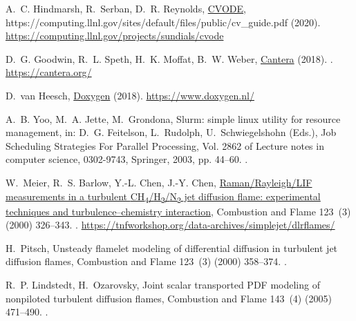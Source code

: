 \documentclass[preprint,12pt, a4paper]{elsarticle}
\begin{document}
\begin{thebibliography}{10}
A.~C. Hindmarsh, R.~Serban, D.~R. Reynolds,
  \href{https://computing.llnl.gov/projects/sundials/cvode}{{CVODE}},
  https://computing.llnl.gov/sites/default/files/public/cv{\_}guide.pdf (2020).
\newline\urlprefix\url{https://computing.llnl.gov/projects/sundials/cvode}

D.~G. Goodwin, R.~L. Speth, H.~K. Moffat, B.~W. Weber,
  \href{https://cantera.org/}{Cantera} (2018).
\newblock \href {http://dx.doi.org/10.5281/zenodo.1174508}
  {}.
\newline\urlprefix\url{https://cantera.org/}

D.~{van Heesch}, \href{https://www.doxygen.nl/}{Doxygen} (2018).
\newline\urlprefix\url{https://www.doxygen.nl/}

A.~B. Yoo, M.~A. Jette, M.~Grondona, Slurm: simple linux utility for resource
  management, in: D.~G. Feitelson, L.~Rudolph, U.~Schwiegelshohn (Eds.), Job
  Scheduling Strategies For Parallel Processing, Vol. 2862 of Lecture notes in
  computer science, 0302-9743, Springer, 2003, pp. 44--60.
\newblock \href {http://dx.doi.org/10.1007/10968987-3}
  {}.

W.~Meier, R.~S. Barlow, Y.-L. Chen, J.-Y. Chen,
  \href{https://tnfworkshop.org/data-archives/simplejet/dlrflames/}{Raman/{R}ayleigh/{LIF}
  measurements in a turbulent
  {CH}\textsubscript{4}/{H}\textsubscript{2}/{N}\textsubscript{2 }jet diffusion
  flame: experimental techniques and turbulence--chemistry interaction},
  Combustion and Flame 123~(3) (2000) 326--343.
\newblock \href {http://dx.doi.org/10.1016/S0010-2180(00)00171-1}
  {}.
\newline\urlprefix\url{https://tnfworkshop.org/data-archives/simplejet/dlrflames/}

H.~Pitsch, Unsteady flamelet modeling of differential diffusion in turbulent
  jet diffusion flames, Combustion and Flame 123~(3) (2000) 358--374.
\newblock \href {http://dx.doi.org/10.1016/S0010-2180(00)00135-8}
  {}.

R.~P. Lindstedt, H.~Ozarovsky, Joint scalar transported {PDF} modeling of
  nonpiloted turbulent diffusion flames, Combustion and Flame 143~(4) (2005)
  471--490.
\newblock \href {http://dx.doi.org/10.1016/j.combustflame.2005.08.030}
  {}.


\end{thebibliography}
\end{document}
